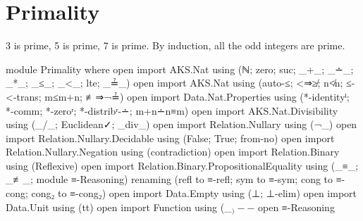 \documentclass[./Thesis.tex]{subfiles}
\begin{document}
\chapter{Primality}
\label{chap:primality}

\epigraph{
  3 is prime, 5 is prime, 7 is prime. By induction, all the odd integers are
  prime.
}{\cite{leroy}}

\begin{code}[hide]
  module Primality where
  open import AKS.Nat using (ℕ; zero; suc; _+_; _∸_; _*_; _≤_; _<_; lte; _≟_)
  open import AKS.Nat using (auto-≤; <⇒≱; n≮n; ≤-<-trans; m≤m+n; ≢⇒¬≟)
  open import Data.Nat.Properties using (*-identityˡ; *-comm; *-zeroʳ; *-distribʳ-∸; m+n∸n≡m)
  open import AKS.Nat.Divisibility using (_/_; Euclidean✓; _div_)
  open import Relation.Nullary using (¬_)
  open import Relation.Nullary.Decidable using (False; True; from-no)
  open import Relation.Nullary.Negation using (contradiction)
  open import Relation.Binary using (Reflexive)
  open import Relation.Binary.PropositionalEquality
    using (_≡_; _≢_; module ≡-Reasoning)
    renaming (refl to ≡-refl; sym to ≡-sym; cong to ≡-cong; cong₂ to ≡-cong₂)
  open import Data.Empty using (⊥; ⊥-elim)
  open import Data.Unit using (tt)
  open import Function using (_$_) -- $
  open ≡-Reasoning
\end{code}
\end{document}
